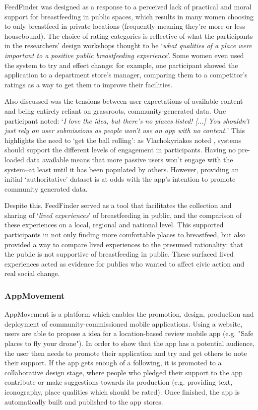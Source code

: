 FeedFinder was designed as a response to a perceived lack of practical and moral support for breastfeeding in public spaces, which results in many women choosing to only breastfeed in private locations (frequently meaning they're more or less housebound). The choice of rating categories is reflective of what the participants in the researchers' design workshops thought to be `\textit{what qualities of a place were important to a positive public breastfeeding experience}'. Some women even used the system to try and effect change: for example, one participant showed the application to a department store's manager, comparing them to a competitor's ratings as a way to get them to improve their facilities. 

Also discussed was the tensions between user expectations of available content and being entirely reliant on grassroots, community-generated data. One participant noted: `\textit{I love the idea, but there's no places listed! [...] You shouldn't just rely on user submissions as people won't use an app with no content.}' This highlights the need to `get the ball rolling': as Vlachokyriakos noted \citep{Vlachokyriakos2014}, systems should support the different levels of engagement in participants. Having no pre-loaded data available means that more passive users won't engage with the system--at least until it has been populated by others. However, providing an initial `authoritative' dataset is at odds with the app's intention to promote community generated data.

Despite this, FeedFinder served as a tool that facilitates the collection and sharing of `\textit{lived experiences}' of breastfeeding in public, and the comparison of these experiences on a local, regional and national level. This supported participants in not only finding more comfortable places to breastfeed, but also provided a way to compare lived experiences to the presumed rationality: that the public is not supportive of breastfeeding in public. These surfaced lived experiences acted as evidence for publics who wanted to affect civic action and real social change.

\subsubsection{AppMovement}

AppMovement is a platform which enables the promotion, design, production and deployment of community-commissioned mobile applications. Using a website, users are able to propose a idea for a location-based review mobile app (e.g. "Safe places to fly your drone"). In order to show that the app has a potential audience, the user then needs to promote their application and try and get others to note their support. If the app gets enough of a following, it is promoted to a collaborative design stage, where people who pledged their support to the app contribute or make suggestions towards its production (e.g. providing text, iconography, place qualities which should be rated). Once finished, the app is automatically built and published to the app stores.

